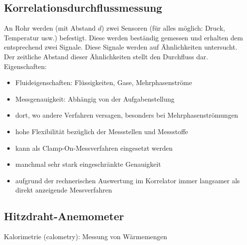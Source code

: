 \subsection{Korrelationsdurchflussmessung}
An Rohr werden (mit Abstand $d$) zwei Sensoren (für alles möglich: Druck, Temperatur usw.) befestigt. Diese werden beständig gemessen und erhalten dem entsprechend zwei Signale. Diese Signale werden auf Ähnlichkeiten untersucht. Der zeitliche Abstand dieser Ähnlichkeiten stellt den Durchfluss dar.\\
Eigenschaften:
\begin{itemize}
\item Fluideigenschaften: Flüssigkeiten, Gase, Mehrphasenströme
\item Messgenauigkeit: Abhängig von der Aufgabenstellung
\end{itemize}
\begin{itemize}[label=$+$]
\item dort, wo andere Verfahren versagen, besonders bei Mehrphasenströmungen
\item hohe Flexibilität bezüglich der Messstellen und Messstoffe
\item kann als Clamp-On-Messverfahren eingesetzt werden
\end{itemize}
\begin{itemize}[label=$-$]
\item manchmal sehr stark eingeschränkte Genauigkeit
\item aufgrund der rechnerischen Auswertung im Korrelator immer langsamer als direkt anzeigende Messverfahren
\end{itemize}

\subsection{Hitzdraht-Anemometer}
Kalorimetrie (calometry): Messung von Wärmemengen
